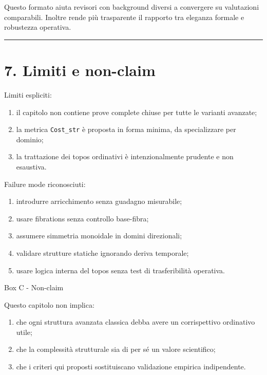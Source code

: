 Questo formato aiuta revisori con background diversi a convergere su valutazioni comparabili.
Inoltre rende più trasparente il rapporto tra eleganza formale e robustezza operativa.

\begin{center}\rule{0.5\linewidth}{0.5pt}\end{center}

\section{7. Limiti e non-claim}

Limiti espliciti:

\begin{enumerate}
\def\labelenumi{\arabic{enumi}.}
\tightlist
\item
  il capitolo non contiene prove complete chiuse per tutte le varianti avanzate;
\item
  la metrica \texttt{Cost\_str} è proposta in forma minima, da specializzare per dominio;
\item
  la trattazione dei topos ordinativi è intenzionalmente prudente e non esaustiva.
\end{enumerate}

Failure mode riconosciuti:

\begin{enumerate}
\def\labelenumi{\arabic{enumi}.}
\tightlist
\item
  introdurre arricchimento senza guadagno misurabile;
\item
  usare fibrations senza controllo base-fibra;
\item
  assumere simmetria monoidale in domini direzionali;
\item
  validare strutture statiche ignorando deriva temporale;
\item
  usare logica interna del topos senza test di trasferibilità operativa.
\end{enumerate}

Box C - Non-claim

Questo capitolo non implica:

\begin{enumerate}
\def\labelenumi{\arabic{enumi}.}
\tightlist
\item
  che ogni struttura avanzata classica debba avere un corrispettivo ordinativo utile;
\item
  che la complessità strutturale sia di per sé un valore scientifico;
\item
  che i criteri qui proposti sostituiscano validazione empirica indipendente.
\end{enumerate}

